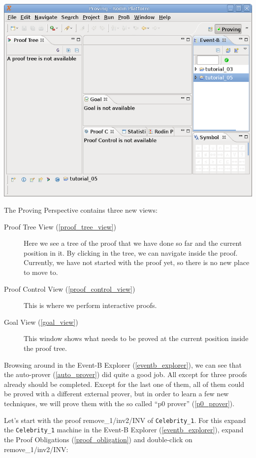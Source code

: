 \begin{center}
	\includegraphics{img/tutorial/tut_08_proving_perspective.png}
\end{center}

The Proving Perspective contains three new views:

\begin{description}
	\item[Proof Tree View (\ref{proof_tree_view})] Here we see a tree of the proof that we have done so far and the current position in it. By clicking in the tree, we can navigate inside the proof. Currently, we have not started with the proof yet, so there is no new place to move to. 
	\item[Proof Control View (\ref{proof_control_view})] This is where we perform interactive proofs.
	\item[Goal View (\ref{goal_view})] This window shows what needs to be proved at the current position inside the proof tree.
\end{description}

Browsing around in the Event-B Explorer (\ref{eventb_explorer}), we can see that the auto-prover (\ref{auto_prover}) did quite a good job. All except for three proofs already should be completed. Except for the last one of them, all of them could be proved with a different external prover, but in order to learn a few new techniques, we will prove them with the so called ``p0 prover'' (\ref{p0_prover}).

Let's start with the proof \textsf{remove\_1/inv2/INV} of \texttt{Celebrity\_1}. For this expand the \texttt{Celebrity\_1} machine in the Event-B Explorer (\ref{eventb_explorer}), expand the Proof Obligations (\ref{proof_obligation}) and double-click on \textsf{remove\_1/inv2/INV}:


